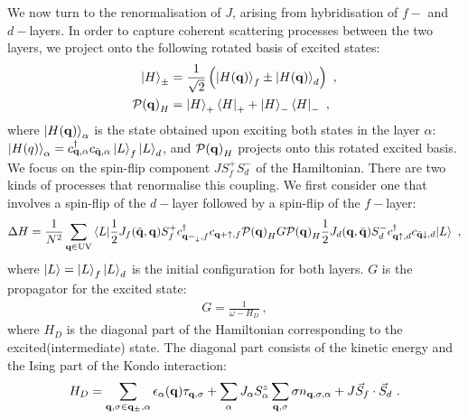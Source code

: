 \documentclass[%
reprint,
superscriptaddress,
groupedaddress,
superscriptaddress,
onecolumn,
10pt
]{revtex4-2}
\begin{document}
We now turn to the renormalisation of \(J\), arising from hybridisation of \(f-\) and \(d-\)layers. In order to capture coherent scattering processes between the two layers, we project onto the following rotated basis of excited states:
\begin{equation}\begin{aligned}
	\ket{H}_\pm &= \frac{1}{\sqrt{2}}\left(\ket{H({\bf q})}_f \pm \ket{H({\bf q})}_d\right)~,\\
	\mathcal{P({\bf q})}_H &= \ket{H}_+\bra{H}_+ + \ket{H}_-\bra{H}_-~,
\end{aligned}\end{equation}
where \(\ket{H({\bf q})}_\alpha\) is the state obtained upon exciting both states in the layer \(\alpha\): \(\ket{H(q)}_\alpha = c^\dagger_{{\bf q},\alpha}c_{\bar {\bf q},\alpha}\ket{L}_f\ket{L}_d\), and \(\mathcal{P({\bf q})}_H\) projects onto this rotated excited basis. We focus on the spin-flip component \(J S_f^+ S_d^-\) of the Hamiltonian. There are two kinds of processes that renormalise this coupling. We first consider one that involves a spin-flip of the \(d-\)layer followed by a spin-flip of the \(f-\)layer:
\begin{equation}\begin{aligned}\label{rgEqtn1}
	\Delta H = \frac{1}{N^2}\sum_{{\bf q} \in \text{UV}}\braket{L | \frac{1}{2}J_f(\bar{\bf q},{\bf q}) S_f^+ c^\dagger_{{\bf q-}_\downarrow,f}c_{{\bf q+}\uparrow,f} \mathcal{P({\bf q})}_H G \mathcal{P({\bf q})}_H\frac{1}{2}J_d({\bf q},\bar{\bf q})S_d^- c^\dagger_{{\bf q}\uparrow,d}c_{\bar {\bf q}\downarrow,d} | L }~,
\end{aligned}\end{equation}
where \(\ket{L} = \ket{L}_f \ket{L}_d\) is the initial configuration for both layers. \(G\) is the propagator for the excited state:
\begin{equation}\begin{aligned}
	G = \frac{1}{\omega - H_D}~,
\end{aligned}\end{equation}
where \(H_D\) is the diagonal part of the Hamiltonian corresponding to the excited(intermediate) state. The diagonal part consists of the kinetic energy and the Ising part of the Kondo interaction:
\begin{equation}\begin{aligned}
	H_D = \sum_{{\bf q,\sigma}\in{\bf q}_\pm, \alpha}\epsilon_\alpha({\bf q})\tau_{{\bf q},\sigma} + \sum_\alpha J_\alpha S_\alpha^z \sum_{{\bf q},\sigma}\sigma n_{{\bf q},\sigma,\alpha} + J \vec{S}_f \cdot \vec{S}_d~.
\end{aligned}\end{equation}
\end{document}
